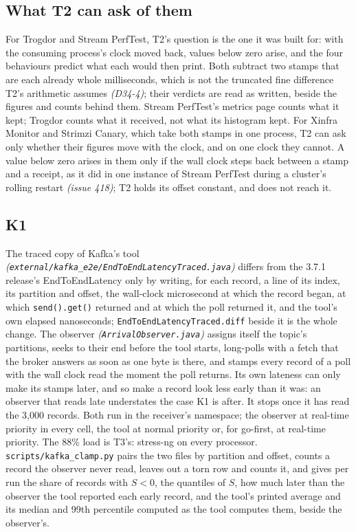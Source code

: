 \documentclass[11pt]{article}
\newcommand{\gl}[1]{{\color{soft}\itshape\small (#1)}}
\begin{document}
\subsection*{What T2 can ask of them}
For Trogdor and Stream PerfTest, T2's question is the one it was built for: with the consuming
process's clock moved back, values below zero arise, and the four behaviours predict what each
would then print. Both subtract two stamps that are each already whole milliseconds, which is not
the truncated fine difference T2's arithmetic assumes \gl{D34-4}; their verdicts are read as
written, beside the figures and counts behind them. Stream PerfTest's metrics page counts what it
kept; Trogdor counts what it received, not what its histogram kept. For Xinfra Monitor and
Strimzi Canary, which take both stamps in one process, T2 can ask only whether their figures move
with the clock, and on one clock they cannot. A value below zero arises in them only if the wall
clock steps back between a stamp and a receipt, as it did in one instance of Stream PerfTest
during a cluster's rolling restart \gl{issue 418}; T2 holds its offset constant, and does not
reach it.

\subsection*{K1}
The traced copy of Kafka's tool \gl{\texttt{external/kafka\_e2e/EndToEndLatencyTraced.java}} differs
from the 3.7.1 release's EndToEndLatency only by writing, for each record, a line of its index, its
partition and offset, the wall-clock microsecond at which the record began, at which
\texttt{send().get()} returned and at which the poll returned it, and the tool's own elapsed
nanoseconds; \texttt{EndToEndLatencyTraced.diff} beside it is the whole change. The observer
\gl{\texttt{ArrivalObserver.java}} assigns itself the topic's partitions, seeks to their end before
the tool starts, long-polls with a fetch that the broker answers as soon as one byte is there, and
stamps every record of a poll with the wall clock read the moment the poll returns. Its own lateness
can only make its stamps later, and so make a record look less early than it was: an observer that
reads late understates the case K1 is after. It stops once it has read the 3,000 records. Both run
in the receiver's namespace; the observer at real-time priority in every cell, the tool at normal
priority or, for go-first, at real-time priority. The 88\% load is T3's: stress-ng on every
processor. \texttt{scripts/kafka\_clamp.py} pairs the two files by partition and offset, counts a
record the observer never read, leaves out a torn row and counts it, and gives per run the share
of records with $S < 0$, the quantiles of $S$, how much later than the observer the tool reported
each early record, and the tool's printed average and its median and 99th percentile computed as
the tool computes them, beside the observer's.
\end{document}
